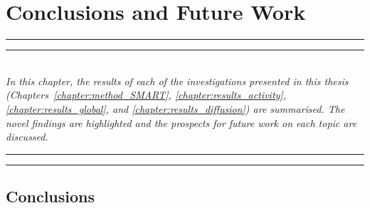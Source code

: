 
\chapter{Conclusions and Future Work} %
\label{chapter:discussion}



    \graphicspath{{8/figures/EPS/}{8/figures/}}

\glsresetall


\hrule height 1mm
\vspace{0.5mm}
\hrule height 0.4mm 
\noindent 
\\ {\it 
In this chapter, the results of each of the investigations presented in this thesis (Chapters~\ref{chapter:method_SMART}, \ref{chapter:results_activity}, \ref{chapter:results_global}, and \ref{chapter:results_diffusion}) are summarised. The novel findings are highlighted and the prospects for future work on each topic are discussed.  
}
\\ 
\hrule height 0.4mm
\vspace{0.5mm}
\hrule height 1mm 
\vspace{1.5cm}

\section{Conclusions}


